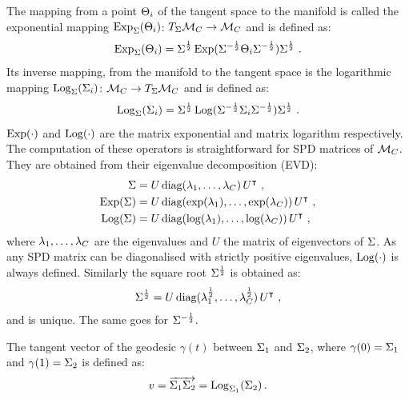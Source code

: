 The mapping from a point $\S_i$ of the tangent space to the manifold is called the exponential mapping $\Exp{\P}(\S_i)$: $T_{\P}\Ma \rightarrow \Ma$ and is defined as:
\begin{equation}
	\label{eq:exp_r}
	\Exp{\P}(\S_i) = \P^{\frac{1}{2}}\Expm(\P^{-\frac{1}{2}}\S_i \P^{-\frac{1}{2}})\P^{\frac{1}{2}} \ .
\end{equation}  
Its inverse mapping, from the manifold to the tangent space is the logarithmic mapping $\Log{\P}(\P_i)$: $\Ma \rightarrow T_{\P}\Ma$ and is defined as:
\begin{equation}
	\label{eq:log_r}
	\Log{\P}(\P_i) = \P^{\frac{1}{2}}\Logm(\P^{-\frac{1}{2}}\P_i \P^{-\frac{1}{2}})\P^{\frac{1}{2}} \ .
\end{equation} 
$\Expm(\cdot)$ and $\Logm(\cdot)$ are the matrix exponential and matrix logarithm respectively.
The computation of these operators is straightforward for SPD matrices of $\Ma$. %
They are obtained from their eigenvalue decomposition (EVD): 
\begin{displaymath}
  \begin{split}
    \P &= U\, \text{diag}(\ev_1, \dots, \ev_\dc)\, U^\intercal \ , \\
    \Expm(\P) &= U\, \text{diag}(\exp(\ev_1), \dots, \exp(\ev_\dc))\, U^\intercal \ , \\
    \Logm(\P) &= U\, \text{diag}(\log(\ev_1), \dots, \log(\ev_\dc))\, U^\intercal \ ,
  \end{split}
\end{displaymath}
where $\ev_1, \dots, \ev_\dc$ are the eigenvalues and $U$ the matrix of eigenvectors of $\P$.
As any SPD matrix can be diagonalised with strictly positive eigenvalues, $\Logm(\cdot)$ is always defined.
Similarly the square root $\P^{\frac{1}{2}}$ is obtained as:
\begin{equation*}
  \label{eq:sqm}
  \P^{\frac{1}{2}} = U\, \text{diag}(\ev_1^{\frac{1}{2}}, \dots, \ev_\dc^{\frac{1}{2}})\, U^\intercal \ , %
\end{equation*}
and is unique. The same goes for $\P^{-\frac{1}{2}}$.

The tangent vector of the geodesic $\gamma(t)$ between $\P_1$ and $\P_2$, where $\gamma(0) = \P_1$ and $\gamma(1) = \P_2$ is defined as:
\begin{equation}
  \label{eq:tan_geo}
  v = \overrightarrow{\P_1 \P_2} = \Log{\P_1}(\P_2) \, . 
\end{equation}

